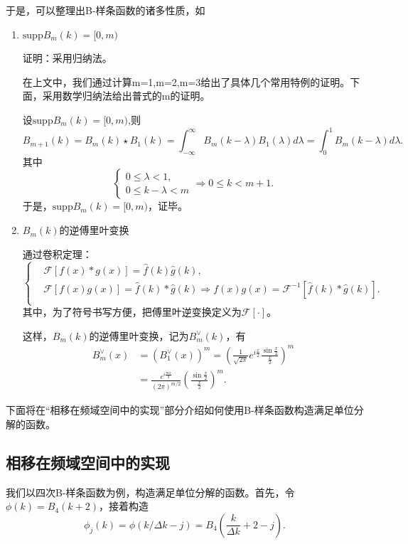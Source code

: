 于是，可以整理出B-样条函数的诸多性质，如
\begin{enumerate}
    \item $\text{supp} B_m(k)=[0,m)$
    
    证明：采用归纳法。

    在上文中，我们通过计算m=1,m=2,m=3给出了具体几个常用特例的证明。下面，采用数学归纳法给出普式的m的证明。

    设$\text{supp} B_m(k)=[0,m)$,则
    \begin{equation*}
    B_{m+1}(k)=B_{m}(k)\star B_{1}(k)=\int_{-\infty}^{\infty}B_{m}(k-\lambda)B_{1}(\lambda)d\lambda=
\int_{0}^{1}B_{m}(k-\lambda)d\lambda .
\end{equation*}
其中
\begin{equation*}
    \left\{\begin{matrix} 
0 \le \lambda <1,\\
0\le k-\lambda <m
\end{matrix}\right. 
\Rightarrow 0\le k <m+1 .
\end{equation*}
于是，$\text{supp} B_m(k)=[0,m)$，证毕。
    \item $B_m(k)$的逆傅里叶变换
    
    通过卷积定理：
    \begin{equation}
        \left\{\begin{matrix} 
& \mathcal{F} [f(x)*g(x)]= \hat{f}(k)\hat{g}(k) , \\
& \mathcal{F}[f(x)g(x)] = \hat{f}(k)*\hat{g}(k)\Rightarrow f(x)g(x) = \mathcal{F}^{-1}[\hat{f}(k)*\hat{g}(k)] .\\
\end{matrix}\right. 
    \end{equation}
其中，为了符号书写方便，把傅里叶逆变换定义为$\mathcal{F[\cdot ]}$。

这样，$B_m(k)$的逆傅里叶变换，记为$B_m^{\vee}(k)$，有
\begin{align}
B_{m}^{\vee}(x)  &  =\left(  B_{1}^{\vee}(x)\right)  ^{m}=\left(  \frac
{1}{\sqrt{2\pi}}e^{i\frac{x}{2}}\frac{\sin\frac{x}{2}}{\frac{x}{2}}\right)
^{m}\nonumber\\
&  =\frac{e^{i\frac{mx}{2}}}{\left(  2\pi\right)  ^{m/2}}\left(  \frac
{\sin\frac{x}{2}}{\frac{x}{2}}\right)  ^{m}.
\end{align}
\end{enumerate}
下面将在“相移在频域空间中的实现”部分介绍如何使用B-样条函数构造满足单位分解的函数。


\subsection{相移在频域空间中的实现}
我们以四次B-样条函数为例，构造满足单位分解的函数。首先，令$\phi(k)=B_{4}(k+2)$，接着构造
\begin{equation}
    \phi_j(k)=\phi(k/\Delta k-j)=B_4(\frac{k}{\Delta k}+2-j) .
\end{equation}

